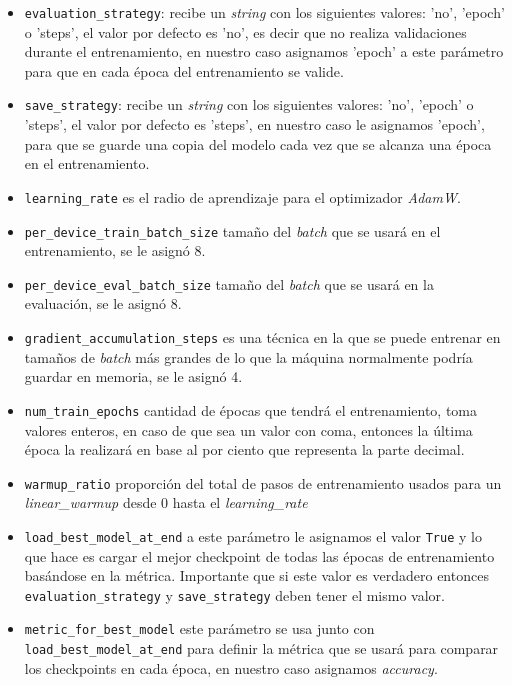 \begin{itemize}
    \item \texttt{evaluation\_strategy}: recibe un \textit{string} con los siguientes valores: 'no', 'epoch' o 'steps', el valor por defecto es 'no', es decir que no realiza validaciones durante el entrenamiento, en nuestro caso asignamos 'epoch' a este parámetro para que en cada época del entrenamiento se valide.
    \item \texttt{save\_strategy}: recibe un \textit{string} con los siguientes valores: 'no', 'epoch' o 'steps', el valor por defecto es 'steps', en nuestro caso le asignamos 'epoch', para que se guarde una copia del modelo cada vez que se alcanza una época en el entrenamiento.
    \item \texttt{learning\_rate} es el radio de aprendizaje para el optimizador \textit{AdamW}.
    \item \texttt{per\_device\_train\_batch\_size} tamaño del \textit{batch} que se usará en el entrenamiento, se le asignó 8.
    \item \texttt{per\_device\_eval\_batch\_size} tamaño del \textit{batch} que se usará en la evaluación, se le asignó 8.
    \item \texttt{gradient\_accumulation\_steps} es una técnica en la que se puede entrenar en tamaños de \textit{batch} más grandes de lo que la máquina normalmente podría guardar en memoria, se le asignó 4.
    \item \texttt{num\_train\_epochs} cantidad de épocas que tendrá el entrenamiento, toma valores enteros, en caso de que sea un valor con coma, entonces la última época la realizará en base al por ciento que representa la parte decimal.
    \item \texttt{warmup\_ratio} proporción del total de pasos de entrenamiento usados para un \textit{linear\_warmup} desde 0 hasta el \textit{learning\_rate}
    \item \texttt{load\_best\_model\_at\_end} a este parámetro le asignamos el valor \texttt{True} y lo que hace es cargar el mejor checkpoint de todas las épocas de entrenamiento basándose en la métrica. Importante que si este valor es verdadero entonces \texttt{evaluation\_strategy} y \texttt{save\_strategy} deben tener el mismo valor.
    \item \texttt{metric\_for\_best\_model} este parámetro se usa junto con \texttt{load\_best\_model\_at\_end} para definir la métrica que se usará para comparar los checkpoints en cada época, en nuestro caso asignamos \textit{accuracy}.
\end{itemize}

